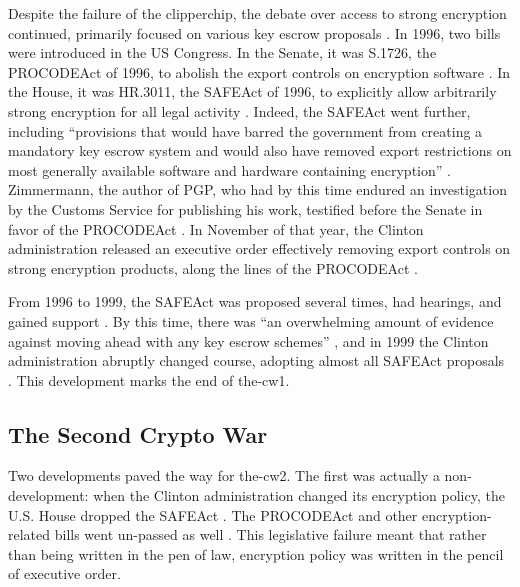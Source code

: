 Despite the failure of the \ac{clipperchip}, the debate over access to strong encryption continued, primarily focused on
various key escrow proposals \cite{thompson_2015}. In 1996, two bills were introduced in the US Congress. In the Senate,
it was S.1726, the \ac{PROCODEAct} of 1996, to abolish the export controls on encryption software
\cite{burns_s1726_1996}. In the House, it was HR.3011, the \ac{SAFEAct} of 1996, to explicitly allow arbitrarily strong
encryption for all legal activity \cite{goodlatte_hr3011_1996}. Indeed, the \ac{SAFEAct} went further, including
``provisions that would have barred the government from creating a mandatory key escrow system and would also have
removed export restrictions on most generally available software and hardware containing encryption''
\cite{kehl_right_2015}. Zimmermann, the author of PGP, who had by this time endured an investigation by the Customs
Service for publishing his work, testified before the Senate in favor of the \ac{PROCODEAct} \cite{zimmermann_1996}. In
November of that year, the Clinton administration released an executive order effectively removing export controls on
strong encryption products, along the lines of the \ac{PROCODEAct} \cite{clinton_1996}.

From 1996 to 1999, the \ac{SAFEAct} was proposed several times, had hearings, and gained support \cite{kehl_right_2015}.
By this time, there was ``an overwhelming amount of evidence against moving ahead with any key escrow schemes''
\cite{thompson_2015}, and in 1999 the Clinton administration abruptly changed course, adopting almost all \ac{SAFEAct}
proposals \cite{kehl_right_2015}. This development marks the end of \ac{the-cw1}.

\subsection{The Second Crypto War}
\label{sec-history-cw2}

Two developments paved the way for \ac{the-cw2}. The first was actually a non-development: when the Clinton
administration changed its encryption policy, the U.S. House dropped the \ac{SAFEAct} \cite{goodlatte_hr3011_1996}. The
\ac{PROCODEAct} and other encryption-related bills went un-passed as well \cite{burns_s1726_1996} \cite{leahy_s376_1997}
\cite{ashcroft_s2067_1998} \cite{goss_hr2616_1999} \cite{goss_hr2617_1999} \cite{administration_CESA_1999}
\cite{leahy_s3083_2000}. This legislative failure meant that rather than being written in the pen of law, encryption
policy was written in the pencil of executive order.

